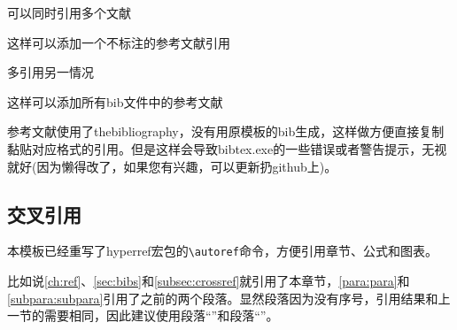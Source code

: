 \documentclass{CustGraduPaper}
\begin{document}
可以同时引用多个文献\cite{Stone_1998,9780124467422,huagongrenzheng2014}

这样可以添加一个不标注的参考文献引用\nocite{9787508342894}

多引用另一情况\cite{Stone_1998,9780124467422,bamboosilk}

这样可以添加所有bib文件中的参考文献\nocite{*}

参考文献使用了thebibliography，没有用原模板的bib生成，这样做方便直接复制黏贴对应格式的引用。但是这样会导致bibtex.exe的一些错误或者警告提示，无视就好(因为懒得改了，如果您有兴趣，可以更新扔github上)。

\subsection{交叉引用}\label{subsec:crossref}
本模板已经重写了hyperref宏包的\verb|\autoref|命令，方便引用章节、公式和图表。

比如说\autoref{ch:ref}、\autoref{sec:bibs}和\autoref{subsec:crossref}就引用了本章节，\autoref{para:para}和\autoref{subpara:subpara}引用了之前的两个段落。显然段落因为没有序号，引用结果和上一节的需要相同，因此建议使用段落“”和段落“”。

\end{document}

